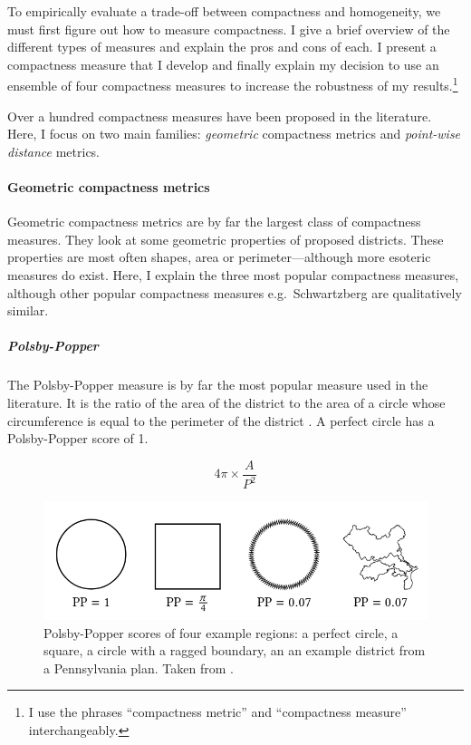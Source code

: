 \documentclass[]{article}
\let\oldparagraph\paragraph
\renewcommand{\paragraph}[1]{\oldparagraph{#1}\mbox{}}
\let\oldsubparagraph\subparagraph
\renewcommand{\subparagraph}[1]{\oldsubparagraph{#1}\mbox{}}
\begin{document}
To empirically evaluate a trade-off between compactness and homogeneity,
we must first figure out how to measure compactness. I give a brief
overview of the different types of measures and explain the pros and
cons of each. I present a compactness measure that I develop and finally
explain my decision to use an ensemble of four compactness measures to
increase the robustness of my results.\footnote{I use the phrases
  ``compactness metric'' and ``compactness measure'' interchangeably.}

Over a hundred compactness measures have been proposed in the
literature. Here, I focus on two main families: \emph{geometric}
compactness metrics and \emph{point-wise distance} metrics.

\hypertarget{geometric-compactness-metrics}{%
\paragraph{Geometric compactness
metrics}\label{geometric-compactness-metrics}}

Geometric compactness metrics are by far the largest class of
compactness measures. They look at some geometric properties of proposed
districts. These properties are most often shapes, area or
perimeter---although more esoteric measures do exist. Here, I explain
the three most popular compactness measures, although other popular
compactness measures e.g.~Schwartzberg are qualitatively similar.

\hypertarget{polsby-popper}{%
\subparagraph{Polsby-Popper}\label{polsby-popper}}

The Polsby-Popper measure is by far the most popular measure used in the
literature. It is the ratio of the area of the district to the area of a
circle whose circumference is equal to the perimeter of the district
\citep{pp1991}. A perfect circle has a Polsby-Popper score of 1.

\[4\pi \times \frac{A}{P^2}\]

\begin{figure}
\centering
\includegraphics{img/pp_example.png}
\caption{Polsby-Popper scores of four example regions: a perfect circle,
a square, a circle with a ragged boundary, an an example district from a
Pennsylvania plan. Taken from \cite{s2020}.}
\end{figure}
\end{document}
